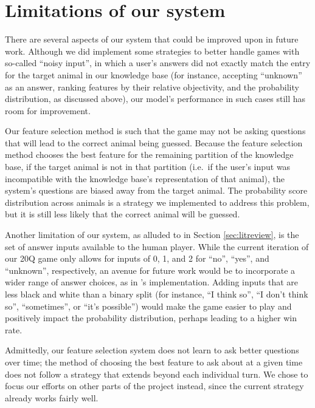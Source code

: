 \documentclass[11pt,a4paper]{article}
\begin{document}
\section{Limitations of our system}
\label{sec:limit}

There are several aspects of our system that could be improved upon in future work. 
Although we did implement some strategies to better handle games with so-called ``noisy input'', in which a user's answers did not exactly match the entry for the target animal in our knowledge base (for instance, accepting ``unknown'' as an answer, ranking features by their relative objectivity, and the probability distribution, as discussed above), our model's performance in such cases still has room for improvement. 

Our feature selection method is such that the game may not be asking questions that will lead to the correct animal being guessed. 
Because the feature selection method chooses the best feature for the remaining partition of the knowledge base, if the target animal is not in that partition (i.e.\ if the user's input was incompatible with the knowledge base's representation of that animal), the system's questions are biased away from the target animal. 
The probability score distribution across animals is a strategy we implemented to address this problem, but it is still less likely that the correct animal will be guessed.

Another limitation of our system, as alluded to in Section \ref{sec:litreview}, is the set of answer inputs available to the human player. 
While the current iteration of our 20Q game only allows for inputs of 0, 1, and 2 for ``no'', ``yes'', and ``unknown'', respectively, an avenue for future work would be to incorporate a wider range of answer choices, as in \citet{Burgener2006}'s implementation. 
Adding inputs that are less black and white than a binary split (for instance, ``I think so'', ``I don't think so'', ``sometimes'', or ``it's possible'') would make the game easier to play and positively impact the probability distribution, perhaps leading to a higher win rate. 

Admittedly, our feature selection system does not learn to ask better questions over time; the method of choosing the best feature to ask about at a given time does not follow a strategy that extends beyond each individual turn. We chose to focus our efforts on other parts of the project instead, since the current strategy already works fairly well.
\end{document}
